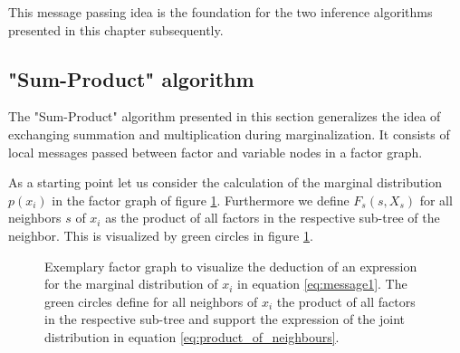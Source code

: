 \documentclass{sigkdd}
\begin{document}
This message passing idea is the foundation for the two inference algorithms presented in this chapter subsequently.


\subsection{"Sum-Product" algorithm}
The "Sum-Product" algorithm presented in this section generalizes the idea of exchanging summation and multiplication during marginalization. It consists of local messages passed between factor and variable nodes in a factor graph.

As a starting point let us consider the calculation of the marginal distribution $p(x_i)$ in the factor graph of figure \ref{fig:message1}. Furthermore we define $F_s(s, X_s)$ for all neighbors $s$ of $x_i$ as the product of all factors in the respective sub-tree of the neighbor. This is visualized by green circles in figure \ref{fig:message1}.
\begin{figure}[h]
	\centering
	\caption{Exemplary factor graph to visualize the deduction of an expression for the marginal distribution of $x_i$ in equation \ref{eq:message1}. The green circles define for all neighbors of $x_i$ the product of all factors in the respective sub-tree and support the expression of the joint distribution in equation \ref{eq:product_of_neighbours}.}\label{fig:message1}
\end{figure}
\end{document}
